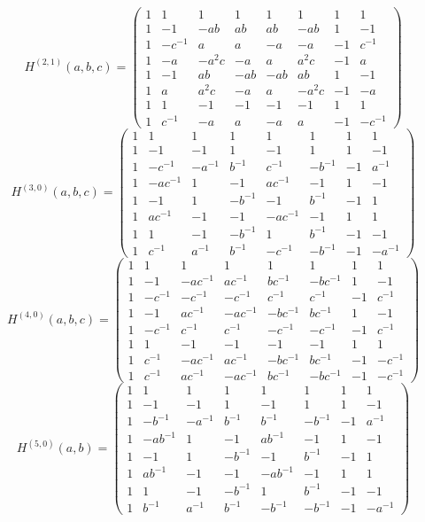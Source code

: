 \documentclass[11pt,a4paper]{article}
\theoremstyle{plain}
\theoremstyle{definition}
\numberwithin{equation}{section}
\begin{document}
\medskip
{\small\setlength{\arraycolsep}{5pt}$$H^{(2,1)}(a,b,c)=
\begin{pmatrix}
1&1&1&1&1&1&1&1\\1&-1&-ab&ab&ab&-ab&1&-1\\1&-c^{-1}&a&a&-a&-a&-1&c^{-1}\\1&-a&-a^{2}c&-a&a&a^{2}c&-1&a\\1&-1&ab&-ab&-ab&ab&1&-1\\1&a&a^{2}c&-a&a&-a^{2}c&-1&-a\\1&1&-1&-1&-1&-1&1&1\\1&c^{-1}&-a&a&-a&a&-1&-c^{-1}
\end{pmatrix}$$}
\medskip
{\small\setlength{\arraycolsep}{5pt}$$H^{(3,0)}(a,b,c)=
\begin{pmatrix}
1&1&1&1&1&1&1&1\\1&-1&-1&1&-1&1&1&-1\\1&-c^{-1}&-a^{-1}&b^{-1}&c^{-1}&-b^{-1}&-1&a^{-1}\\1&-ac^{-1}&1&-1&ac^{-1}&-1&1&-1\\1&-1&1&-b^{-1}&-1&b^{-1}&-1&1\\1&ac^{-1}&-1&-1&-ac^{-1}&-1&1&1\\1&1&-1&-b^{-1}&1&b^{-1}&-1&-1\\1&c^{-1}&a^{-1}&b^{-1}&-c^{-1}&-b^{-1}&-1&-a^{-1}
\end{pmatrix}$$}
\medskip
{\small\setlength{\arraycolsep}{5pt}$$H^{(4,0)}(a,b,c)=
\begin{pmatrix}
1&1&1&1&1&1&1&1\\1&-1&-ac^{-1}&ac^{-1}&bc^{-1}&-bc^{-1}&1&-1\\1&-c^{-1}&-c^{-1}&-c^{-1}&c^{-1}&c^{-1}&-1&c^{-1}\\1&-1&ac^{-1}&-ac^{-1}&-bc^{-1}&bc^{-1}&1&-1\\1&-c^{-1}&c^{-1}&c^{-1}&-c^{-1}&-c^{-1}&-1&c^{-1}\\1&1&-1&-1&-1&-1&1&1\\1&c^{-1}&-ac^{-1}&ac^{-1}&-bc^{-1}&bc^{-1}&-1&-c^{-1}\\1&c^{-1}&ac^{-1}&-ac^{-1}&bc^{-1}&-bc^{-1}&-1&-c^{-1}
\end{pmatrix}$$}
\medskip
{\small\setlength{\arraycolsep}{5pt}$$H^{(5,0)}(a,b)=
\begin{pmatrix}
1&1&1&1&1&1&1&1\\1&-1&-1&1&-1&1&1&-1\\1&-b^{-1}&-a^{-1}&b^{-1}&b^{-1}&-b^{-1}&-1&a^{-1}\\1&-ab^{-1}&1&-1&ab^{-1}&-1&1&-1\\1&-1&1&-b^{-1}&-1&b^{-1}&-1&1\\1&ab^{-1}&-1&-1&-ab^{-1}&-1&1&1\\1&1&-1&-b^{-1}&1&b^{-1}&-1&-1\\1&b^{-1}&a^{-1}&b^{-1}&-b^{-1}&-b^{-1}&-1&-a^{-1}
\end{pmatrix}$$}
\end{document}
